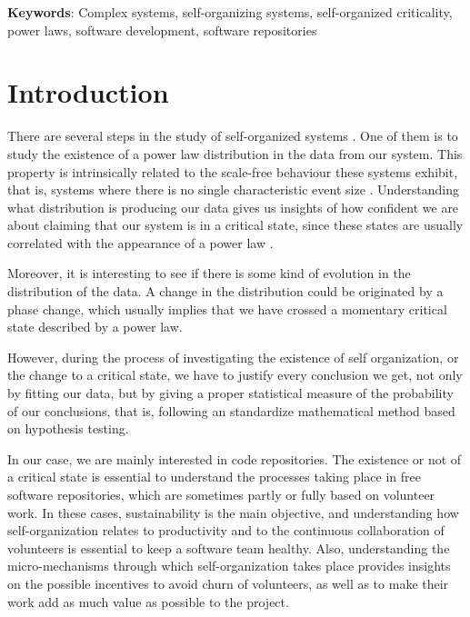 \documentclass{article}
\begin{document}
\textbf{Keywords}: Complex systems, self-organizing systems, self-organized
  criticality, power laws, software development, software repositories



\section{Introduction}\label{introduction}

There are several steps in the study of self-organized systems
\cite{bak1988self}. One of them is to study the existence of a
power law distribution in the data from our system. This property is
intrinsically related to the scale-free behaviour these systems
exhibit, that is, systems where there is no single characteristic
event size \cite{golyk20self}.  Understanding what distribution is
producing our data gives us insights of how confident we are about
claiming that our system is in a critical state, since these states
are usually correlated with the appearance of a power law
\cite{newman2005power}.

Moreover, it is interesting to see if there is some kind of evolution
in the distribution of the data.  A change in the distribution
could be originated by a phase change, which usually implies that
we have crossed a momentary critical state described by a power law. %

However, during the process of investigating the existence of self
organization, or the change to a critical state, we have to justify
every conclusion we get, not only by fitting our data, but by giving a
proper statistical measure of the probability of our conclusions, that
is, following an standardize mathematical method based on hypothesis
testing.

In our case, we are mainly interested in code repositories. The
existence or not of a critical state is essential to understand the
processes taking place in free software repositories, which are
sometimes partly or fully based on volunteer work. In these cases,
sustainability is the main objective, and understanding how
self-organization relates to productivity and to the continuous
collaboration of volunteers is essential to keep a software team
healthy. Also, understanding the micro-mechanisms through which
self-organization takes place provides insights on the possible
incentives to avoid churn of volunteers, as well as to make their work
add as much value as possible to the project.
\end{document}
